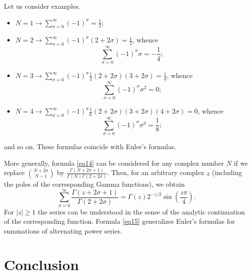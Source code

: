 \documentclass{article}
\begin{document}
Let us consider examples.
\begin{itemize}
\item $N = 1 \rightarrow \sum_{\sigma = 0}^{\infty}(-1)^\sigma = \frac{1}{2}$;
\item $N = 2 \rightarrow \sum_{\sigma = 0}^{\infty}(-1)^\sigma(2 + 2\sigma) = \frac{1}{2}$, whence
$$
\sum_{\sigma = 0}^{\infty}(-1)^{\sigma}\sigma = -\frac{1}{4};
$$
\item $N = 3 \rightarrow \sum_{\sigma = 0}^{\infty}(-1)^\sigma\frac12(2 + 2\sigma)(3 + 2\sigma) = \frac{1}{4}$, whence
$$
\sum_{\sigma = 0}^{\infty}(-1)^{\sigma}\sigma^2 = 0;
$$
\item $N = 4 \rightarrow \sum_{\sigma = 0}^{\infty}(-1)^\sigma\frac{1}{6}(2 + 2\sigma)(3 + 2\sigma)(4 + 2\sigma) = 0$,
whence
$$
\sum_{\sigma = 0}^{\infty}(-1)^\sigma \sigma^3 = \frac{1}{8};
$$
\end{itemize}
and so on. These formulas coincide with Euler's formulas.

More generally, formula \eqref{eq14} can be considered for any complex number $N$ if we replace ${N + 2\sigma \choose N - 1}$ by $\frac{\Gamma(N + 2\sigma + 1)}{\Gamma(N) \Gamma(2 + 2\sigma)}$. Then, for an arbitrary complex $z$ (including the poles of the corresponding Gamma functions), we obtain
\begin{equation}\label{eq15}
\sum_{\sigma = 0}^{\infty}\frac{\Gamma(z + 2\sigma + 1)}{\Gamma(2 + 2\sigma)} = \Gamma(z)2^{-z/2}\sin\left(\frac{z\pi}{4}\right).
\end{equation}
For $|z| \geq 1$ the series can be understood in the sense of the analytic continuation of the corresponding function. Formula \eqref{eq15} generalizes Euler's formulas for summations of alternating power series.

\section{Conclusion}
\end{document}
